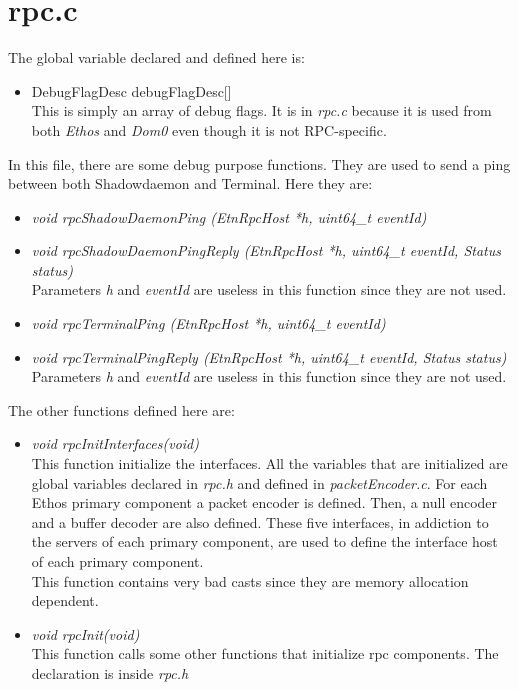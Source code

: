 \section{rpc.c}

The global variable declared and defined here is:

\begin{itemize}
\item DebugFlagDesc debugFlagDesc[]\\
This is simply an array of debug flags. It is in \emph{rpc.c} because it is used from both \emph{Ethos} and \emph{Dom0} even though it is not RPC-specific. 
\end{itemize}

In this file, there are some debug purpose functions. They are used to send a ping between both Shadowdaemon and Terminal. Here they are:
\begin{itemize}
\item \emph{void rpcShadowDaemonPing (EtnRpcHost *h, uint64\_t eventId)}\\
\item \emph{void rpcShadowDaemonPingReply (EtnRpcHost *h, uint64\_t eventId, Status status)}\\
Parameters \emph{h} and \emph{eventId} are useless in this function since they are not used.
\item \emph{void rpcTerminalPing (EtnRpcHost *h, uint64\_t eventId)}\\
\item \emph{void rpcTerminalPingReply (EtnRpcHost *h, uint64\_t eventId, Status status)}\\
Parameters \emph{h} and \emph{eventId} are useless in this function since they are not used.
\end{itemize}

The other functions defined here are:

\begin{itemize}
\item \emph{void rpcInitInterfaces(void)}\\
This function initialize the interfaces. All the variables that are initialized are global variables declared in \emph{rpc.h} and defined in \emph{packetEncoder.c}. For each Ethos primary component a packet encoder is defined. Then, a null encoder and a buffer decoder are also defined. These five interfaces, in addiction to the servers of each primary component, are used to define the interface host of each primary component.\\
This function contains very bad casts since they are memory allocation dependent.
\item \emph{void rpcInit(void)}\\
This function calls some other functions that initialize rpc components. The declaration is inside \emph{rpc.h}
\end{itemize}